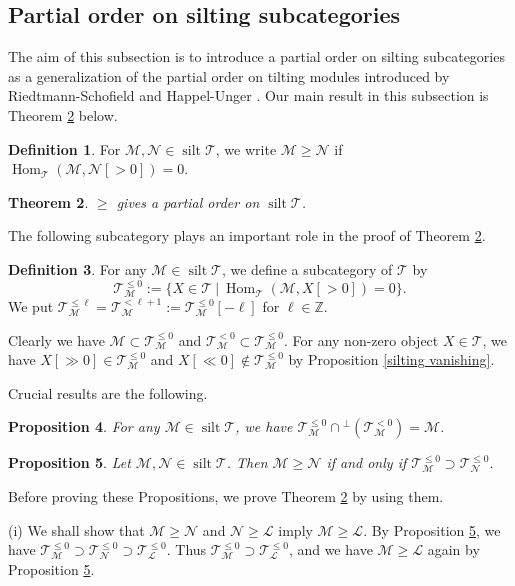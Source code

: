 \documentclass[a4paper,reqno]{amsart}
\newtheorem{theorem}{Theorem}[section]
\newtheorem{proposition}[theorem]{Proposition}
\theoremstyle{definition}
\newtheorem{definition}[theorem]{Definition}
\newcommand{\TT}{{\mathcal T}}
\newcommand{\MM}{{\mathcal M}}
\newcommand{\NN}{{\mathcal N}}
\newcommand{\LL}{{\mathcal L}}
\newcommand{\Z}{\mathbb{Z}}
\newcommand{\Hom}{\operatorname{Hom}\nolimits}
\newcommand{\silt}{\operatorname{silt}\nolimits}
\begin{document}
\subsection{Partial order on silting subcategories}

The aim of this subsection is to introduce a partial order on silting subcategories
as a generalization of the partial order on tilting modules introduced by
Riedtmann-Schofield \cite{RS} and Happel-Unger \cite{HU}.
Our main result in this subsection is Theorem \ref{partial order} below.

\begin{definition}
For $\MM,\NN\in\silt\TT$, we write $\MM\ge\NN$ if $\Hom_{\TT}(\MM, \NN[>0])=0$.
\end{definition}

\begin{theorem}\label{partial order}
$\ge$ gives a partial order on $\silt\TT$.
\end{theorem}

The following subcategory plays an important role in the proof of Theorem \ref{partial order}.

\begin{definition}
For any $\MM\in\silt\TT$, we define a subcategory of $\TT$ by
\[\TT_{\MM}^{\le0}:=\{X\in\TT\ |\ \Hom_{\TT}(\MM, X[>0])=0\}.\]
We put $\TT_{\MM}^{\le\ell}=\TT_{\MM}^{<\ell+1}:=\TT_{\MM}^{\le0}[-\ell]$ for $\ell\in\Z$.
\end{definition}

Clearly we have $\MM\subset\TT_{\MM}^{\le0}$ and $\TT_{\MM}^{<0}\subset\TT_{\MM}^{\le0}$.
For any non-zero object $X\in\TT$, we have $X[\gg0]\in\TT_{\MM}^{\le0}$ and $X[\ll0]\notin\TT_{\MM}^{\le0}$ 
by Proposition \ref{silting vanishing}.

Crucial results are the following.

\begin{proposition}\label{recover}
For any $\MM\in\silt\TT$, we have $\TT_{\MM}^{\le0}\cap{}^\perp(\TT_{\MM}^{<0})=\MM$.
\end{proposition}

\begin{proposition}\label{another condition}
Let $\MM,\NN\in\silt\TT$.
Then $\MM\ge\NN$ if and only if $\TT_{\MM}^{\le0}\supset\TT_{\NN}^{\le0}$.
\end{proposition}

Before proving these Propositions, we prove Theorem \ref{partial order} by using them.

(i) We shall show that $\MM\ge\NN$ and $\NN\ge\LL$ imply $\MM\ge\LL$.
By Proposition \ref{another condition}, we have $\TT_{\MM}^{\le0}\supset\TT_{\NN}^{\le0}\supset\TT_{\LL}^{\le0}$.
Thus $\TT_{\MM}^{\le0}\supset\TT_{\LL}^{\le0}$, and we have $\MM\ge\LL$ again by Proposition \ref{another condition}.
\end{document}
